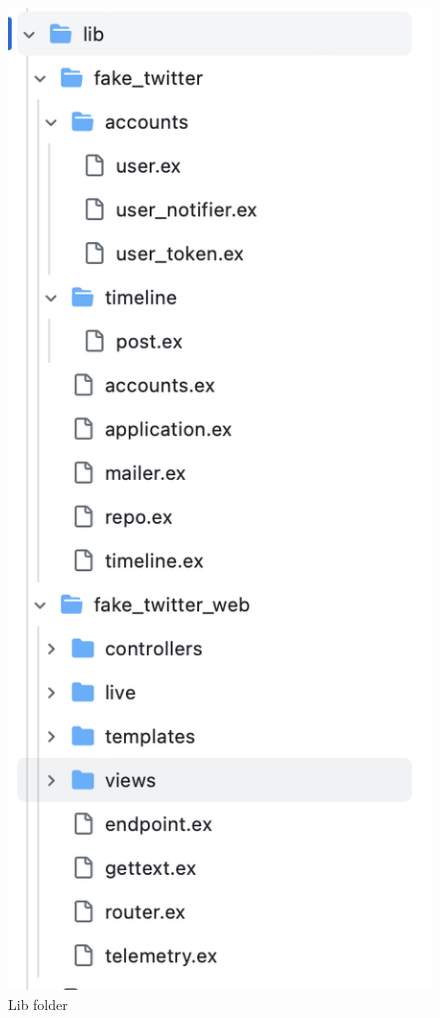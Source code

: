 \begin{figure}[htbp]
	\centering
	\includegraphics[scale=0.5]{figures/lib.png}  %
	\caption{Lib folder}
	\label{fig:phx}
\end{figure}


